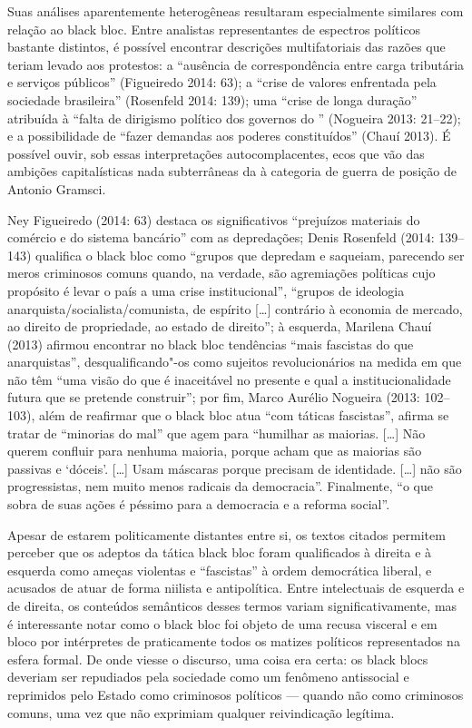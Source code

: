 Suas análises aparentemente heterogêneas resultaram especialmente
similares com relação ao black bloc. Entre analistas representantes de
espectros políticos bastante distintos, é possível encontrar descrições
multifatoriais das razões que teriam levado aos protestos: a ``ausência
de correspondência entre carga tributária e serviços públicos''
(Figueiredo 2014: 63); a ``crise de valores enfrentada pela sociedade
brasileira'' (Rosenfeld 2014: 139); uma ``crise de longa duração''
atribuída à ``falta de dirigismo político dos governos do '' (Nogueira
2013: 21--22); e a possibilidade de ``fazer demandas aos poderes
constituídos'' (Chauí 2013). É possível ouvir, sob essas
interpretações autocomplacentes, ecos que vão das ambições
capitalísticas nada subterrâneas da  à categoria de guerra de
posição de Antonio Gramsci.

Ney Figueiredo (2014: 63) destaca os significativos ``prejuízos
materiais do comércio e do sistema bancário'' com as depredações; Denis
Rosenfeld (2014: 139--143) qualifica o black bloc como ``grupos
que depredam e saqueiam, parecendo ser meros criminosos comuns quando,
na verdade, são agremiações políticas cujo propósito é levar o país a
uma crise institucional'', ``grupos de ideologia
anarquista/socialista/comunista, de espírito {[}\ldots{}{]} contrário à
economia de mercado, ao direito de propriedade, ao estado de direito'';
à esquerda, Marilena Chauí (2013) afirmou encontrar no black bloc
tendências ``mais fascistas do que anarquistas'', desqualificando"-os
como sujeitos revolucionários na medida em que não têm ``uma visão do
que é inaceitável no presente e qual a institucionalidade futura que se
pretende construir''; por fim, Marco Aurélio Nogueira (2013: 102--103),
além de reafirmar que o black bloc atua ``com táticas
fascistas'', afirma se tratar de ``minorias do mal'' que agem para
``humilhar as maiorias. {[}\ldots{}{]} Não querem confluir para nenhuma
maioria, porque acham que as maiorias são passivas e `dóceis'.
{[}\ldots{}{]} Usam máscaras porque precisam de identidade.
{[}\ldots{}{]} não são progressistas, nem muito menos radicais da
democracia''. Finalmente, ``o que sobra de suas ações é
péssimo para a democracia e a reforma social''.

Apesar de estarem politicamente distantes entre si, os textos citados
permitem perceber que os adeptos da tática black bloc foram qualificados
à direita e à esquerda como ameças violentas e ``fascistas'' à ordem
democrática liberal, e acusados de atuar de forma niilista e
antipolítica. Entre intelectuais de esquerda e de direita, os conteúdos
semânticos desses termos variam significativamente, mas é interessante
notar como o black bloc foi objeto de uma recusa visceral e em bloco por
intérpretes de praticamente todos os matizes políticos representados na
esfera formal. De onde viesse o discurso, uma coisa era certa: os black
blocs deveriam ser repudiados pela sociedade como um fenômeno
antissocial e reprimidos pelo Estado como criminosos políticos --- quando
não como criminosos comuns, uma vez que não exprimiam qualquer
reivindicação legítima.

